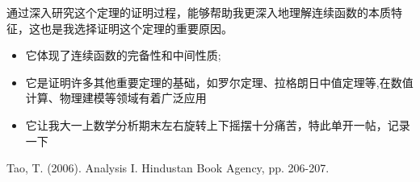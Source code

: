 \documentclass[a4paper]{article}
\begin{document}
通过深入研究这个定理的证明过程，能够帮助我更深入地理解连续函数的本质特征，这也是我选择证明这个定理的重要原因。

\begin{itemize}[label=\tiny{$\bullet$}, itemsep=0pt]
    \item 它体现了连续函数的完备性和中间性质;
    \item 它是证明许多其他重要定理的基础，如罗尔定理、拉格朗日中值定理等,在数值计算、物理建模等领域有着广泛应用
    \item 它让我大一上数学分析期末左右旋转上下摇摆十分痛苦，特此单开一帖，记录一下
\end{itemize}

\begin{thebibliography}{99}
     Tao, T. (2006). Analysis I. Hindustan Book Agency, pp. 206-207.
\end{thebibliography}
\end{document}
